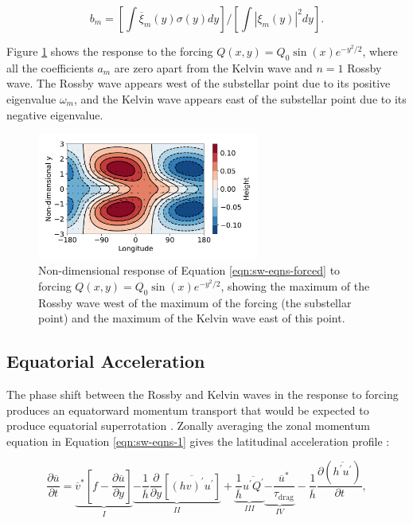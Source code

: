 \begin{equation}
  b _ { m } = \left[ \int \overline { \xi } _ { m } ( y ) \sigma ( y ) d y \right] / \left[ \int \left| \xi _ { m } ( y ) \right| ^ { 2 } d y \right].
\end{equation}

Figure \ref{fig:beta-plane-forced} shows the response to the forcing $Q(x,y) = Q_{0} \sin(x) e^{-y^{2}/2}$, where all the coefficients $a_{m}$ are zero apart from the Kelvin wave and $n=1$ Rossby wave. The Rossby wave appears west of the substellar point due to its positive eigenvalue $\omega_{m}$, and the Kelvin wave appears east of the substellar point due to its negative eigenvalue.

\begin{figure}
  \centering
  \includegraphics[width=0.65\textwidth]{figures/eqm-zonal-flow/beta-plane-forced.pdf}
  \caption{Non-dimensional response of Equation \ref{eqn:sw-eqns-forced} to forcing $Q(x,y) = Q_{0} \sin(x) e^{-y^{2}/2}$, showing the maximum of the Rossby wave west of the maximum of the forcing (the substellar point) and the maximum of the Kelvin wave east of this point.}\label{fig:beta-plane-forced}
\end{figure}


\subsection{Equatorial Acceleration}

The phase shift between the Rossby and Kelvin waves in the response to forcing produces an equatorward momentum transport that would be expected to produce equatorial superrotation \citep{showman2011superrotation, tsai2014three}. Zonally averaging the zonal momentum equation in Equation \ref{eqn:sw-eqns-1} gives the latitudinal acceleration profile \citep{thuburn1999zonalmean}:

\begin{equation}\label{eqn:zonal-mean-mom-no-R}
  \frac { \partial \overline { u } } { \partial t } = \underbrace { \overline { v } ^ { * } \left[ f - \frac { \partial \overline { u } } { \partial y } \right] } _ { I } \underbrace { - \frac { 1 } { \overline { h } } \frac { \partial } { \partial y } \left[ \overline { ( h v ) ^ { \prime } u ^ { \prime } } \right] } _ { I I } + \underbrace {  \frac { 1 } { \overline { h } } \overline { u ^ { \prime } Q ^ { \prime } } } _ { I I I } \underbrace { - \frac { \overline { u } ^ { * } } { \tau _ { \mathrm { drag } } } } _ { I V } - \frac { 1 } { \overline { h } } \frac { \partial \left( \overline { h ^ { \prime } u ^ { \prime } } \right) } { \partial t },
\end{equation}

